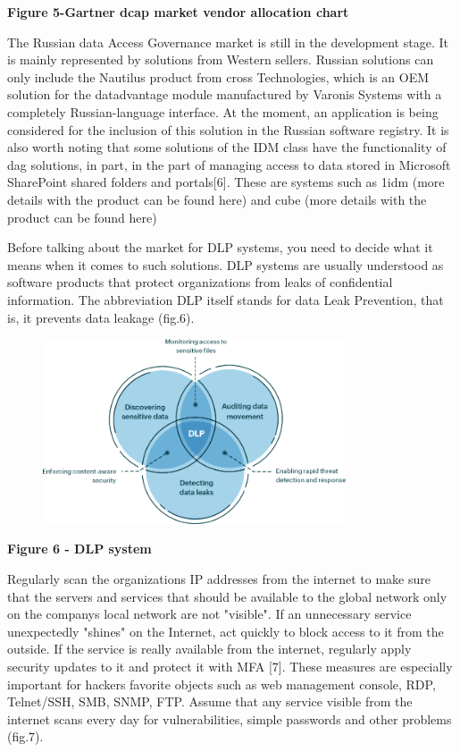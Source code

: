 \textbf{Figure 5-Gartner dcap market vendor allocation chart}

The Russian data Access Governance market is still in the development
stage. It is mainly represented by solutions from Western sellers.
Russian solutions can only include the Nautilus product from cross
Technologies, which is an OEM solution for the datadvantage module
manufactured by Varonis Systems with a completely Russian-language
interface. At the moment, an application is being considered for the
inclusion of this solution in the Russian software registry. It is also
worth noting that some solutions of the IDM class have the functionality
of dag solutions, in part, in the part of managing access to data stored
in Microsoft SharePoint shared folders and portals{[}6{]}. These are
systems such as 1idm (more details with the product can be found here)
and cube (more details with the product can be found here)

Before talking about the market for DLP systems, you need to decide what
it means when it comes to such solutions. DLP systems are usually
understood as software products that protect organizations from leaks of
confidential information. The abbreviation DLP itself stands for data
Leak Prevention, that is, it prevents data leakage (fig.6).

\begin{figure}[H]
	\centering
	\includegraphics[width=0.8\textwidth]{assets/68}
	\caption*{}
\end{figure}

\textbf{Figure 6 - DLP system}

Regularly scan the organization\textquotesingle s IP addresses from the
internet to make sure that the servers and services that should be
available to the global network only on the company\textquotesingle s
local network are not "visible". If an unnecessary service unexpectedly
"shines" on the Internet, act quickly to block access to it from the
outside. If the service is really available from the internet, regularly
apply security updates to it and protect it with MFA {[}7{]}. These
measures are especially important for hackers \textquotesingle{}
favorite objects such as web management console, RDP, Telnet/SSH, SMB,
SNMP, FTP. Assume that any service visible from the internet scans every
day for vulnerabilities, simple passwords and other problems (fig.7).

